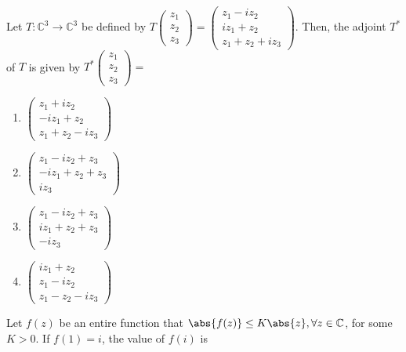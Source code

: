 \iffalse

\chapter{2011}
\section{ma}
\author{AI24BTECH11023 - Tarun Reddy Pakala}
\fi

\item Let $T:\mathbb{C}^3 \to \mathbb{C}^3$ be defined by $T\begin{pmatrix}
z_1 \\
z_2 \\
z_3
\end{pmatrix}=\begin{pmatrix}
z_1-iz_2 \\
iz_1+z_2 \\
z_1+z_2+iz_3
\end{pmatrix}$. Then, the adjoint $T^*$ of $T$ is given by $T^*\begin{pmatrix}
z_1 \\
z_2 \\
z_3
\end{pmatrix}=$
\begin{enumerate}
 \item $  \begin{pmatrix}
z_1+iz_2 \\
-iz_1+z_2 \\
z_1+z_2-iz_3
\end{pmatrix}$
    \item $\begin{pmatrix}
z_1-iz_2+z_3 \\
-iz_1+z_2+z_3 \\
iz_3
\end{pmatrix}$
    \item $\begin{pmatrix}
z_1-iz_2+z_3 \\
iz_1+z_2+z_3 \\
-iz_3
\end{pmatrix}$
    \item $\begin{pmatrix}
iz_1+z_2 \\
z_1-iz_2 \\
z_1-z_2-iz_3
\end{pmatrix}$
\end{enumerate}
\item Let $f(z)$ be an entire function that $\abs{f(z)}\leq K\abs{z}, \forall z \in \mathbb{C}$, for some $K>0$. If $f(1)=i$, the value of $f(i)$ is
